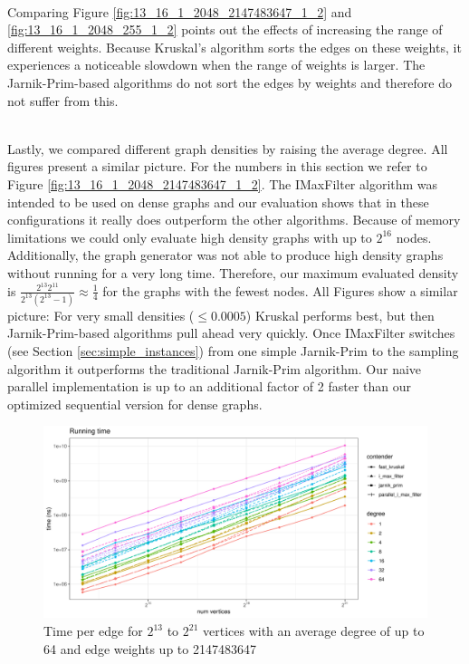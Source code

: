 \documentclass{article}
\begin{document}
\noindent \\
Comparing Figure \ref{fig:13_16_1_2048_2147483647_1_2} and \ref{fig:13_16_1_2048_255_1_2} points out the effects of increasing the range of different weights.
Because Kruskal's algorithm sorts the edges on these weights, it experiences a noticeable slowdown when the range of weights is larger.
The Jarnik-Prim-based algorithms do not sort the edges by weights and therefore do not suffer from this.

\noindent \\
Lastly, we compared different graph densities by raising the average degree.
All figures present a similar picture.
For the numbers in this section we refer to Figure \ref{fig:13_16_1_2048_2147483647_1_2}.
The IMaxFilter algorithm was intended to be used on dense graphs and our evaluation shows that in these configurations it really does outperform the other algorithms.
Because of memory limitations we could only evaluate high density graphs with up to $2^{16}$ nodes.
Additionally, the graph generator was not able to produce high density graphs without running for a very long time.
Therefore, our maximum evaluated density is $\frac{2^{13} 2^{11}}{2^{13} (2^{13}-1)} \approx \frac{1}{4}$ for the graphs with the fewest nodes.
All Figures show a similar picture: For very small densities ($\leq 0.0005$) Kruskal performs best, but then Jarnik-Prim-based algorithms pull ahead very quickly.
Once IMaxFilter switches (see Section \ref{sec:simple_instances}) from one simple Jarnik-Prim to the sampling algorithm it outperforms the traditional Jarnik-Prim algorithm.
Our naive parallel implementation is up to an additional factor of 2 faster than our optimized sequential version for dense graphs.


\begin{figure}[htpb]
  \centering
  \includegraphics[width=\linewidth, page=3]{../plots/13_21_1_64_2147483647_1_2.pdf}
  \caption{Time per edge for $2^{13}$ to $2^{21}$ vertices with an average degree of up to 64 and edge weights up to 2147483647}%
  \label{fig:13_21_1_64_2147483647_1_2_p3}
\end{figure}
\end{document}
